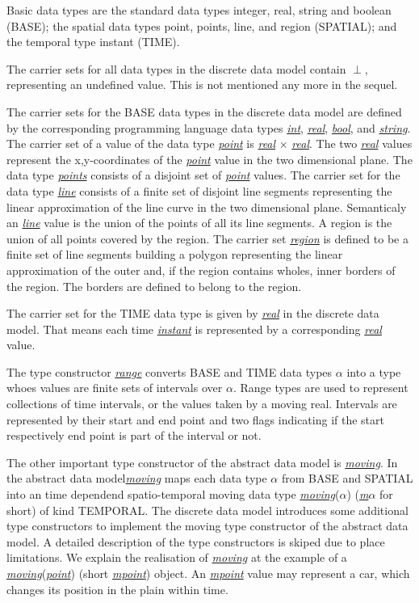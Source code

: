 \documentclass[a4paper]{article}
\newcommand{\dt}[1]{\textsl{\underline{#1}}}
\begin{document}
Basic data types are the standard data types integer, real, string and boolean 
(BASE);
the spatial data types point, points, line, and region (SPATIAL);
and the temporal type instant (TIME).

The carrier sets for all data types in the discrete data model contain $\perp$,
representing an undefined value. This is not mentioned any more in the sequel.

The carrier sets for the BASE data types in the discrete data model are defined
by the corresponding programming language data types \dt{int}, \dt{real}, \dt{bool},
and \dt{string}. The carrier set of a value of the data type \dt{point} is
\dt{real} $\times$ \dt{real}. The two \dt{real} values represent the x,y-coordinates
of the \dt{point} value in the two dimensional plane. The data type \dt{points}
consists of a disjoint set of \dt{point} values. The carrier set for the data
type \dt{line}
consists of a finite set of disjoint line segments representing the linear
approximation of the line curve in the two dimensional plane. Semanticaly an
\dt{line} value is the union of the points of all its line segments. A region
is the union of all points covered by the region. The carrier set \dt{region}
is defined to be a finite set of line segments building a polygon representing
the linear approximation of the outer and, if the region contains wholes, inner
borders of the region. The borders are defined to belong to the region.

The carrier set for the TIME data type is given by \dt{real} in the discrete
data model.
That means each time \dt{instant} is represented by a corresponding \dt{real}
value.

The type constructor \dt{range} converts BASE and TIME data types $\alpha$ into
a type whoes values are finite sets of intervals over $\alpha$. Range types are
used to represent collections of time intervals, or the values taken by a moving
real. Intervals are represented by their start and end point and two flags 
indicating
if the start respectively end point is part of the interval or not.

The other important type constructor of the abstract data model is \dt{moving}.
In the abstract data model\dt{moving} maps each data type $\alpha$ from BASE and
SPATIAL into an time dependend spatio-temporal moving data type 
\dt{moving}($\alpha$)
(\dt{m$\alpha$} for short) of kind TEMPORAL. The discrete data model introduces some
additional type constructors to implement the moving type constructor of the
abstract data model. A detailed description of the type constructors is skiped
due to place limitations. We explain the realisation of \dt{moving} at the example
of a \dt{moving}(\dt{point}) (short \dt{mpoint}) object. An \dt{mpoint} value
may represent a car, which changes its position in the plain within time.
\end{document}
